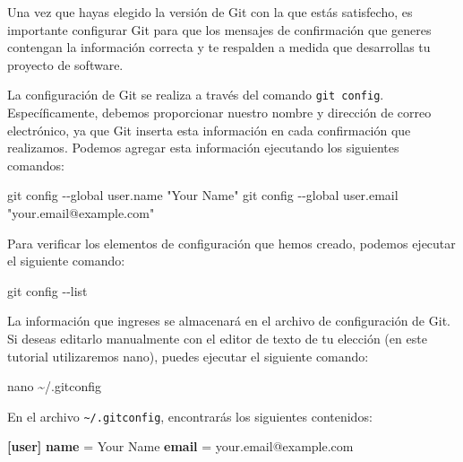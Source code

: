 \documentclass[
  a4paper,
]{article}
\newenvironment{Shaded}{}{}
\newcommand{\AttributeTok}[1]{\textcolor[rgb]{0.84,0.23,0.29}{#1}}
\newcommand{\ExtensionTok}[1]{\textcolor[rgb]{0.84,0.23,0.29}{\textbf{#1}}}
\newcommand{\FunctionTok}[1]{\textcolor[rgb]{0.44,0.26,0.76}{#1}}
\newcommand{\NormalTok}[1]{\textcolor[rgb]{0.14,0.16,0.18}{#1}}
\newcommand{\StringTok}[1]{\textcolor[rgb]{0.01,0.18,0.38}{#1}}
\begin{document}
Una vez que hayas elegido la versión de Git con la que estás satisfecho,
es importante configurar Git para que los mensajes de confirmación que
generes contengan la información correcta y te respalden a medida que
desarrollas tu proyecto de software.

La configuración de Git se realiza a través del comando
\texttt{git\ config}. Específicamente, debemos proporcionar nuestro
nombre y dirección de correo electrónico, ya que Git inserta esta
información en cada confirmación que realizamos. Podemos agregar esta
información ejecutando los siguientes comandos:

\begin{Shaded}
\begin{Highlighting}[]
\FunctionTok{git}\NormalTok{ config }\AttributeTok{{-}{-}global}\NormalTok{ user.name }\StringTok{"Your Name"}
\FunctionTok{git}\NormalTok{ config }\AttributeTok{{-}{-}global}\NormalTok{ user.email }\StringTok{"your.email@example.com"}
\end{Highlighting}
\end{Shaded}

Para verificar los elementos de configuración que hemos creado, podemos
ejecutar el siguiente comando:

\begin{Shaded}
\begin{Highlighting}[]
\FunctionTok{git}\NormalTok{ config }\AttributeTok{{-}{-}list}
\end{Highlighting}
\end{Shaded}

La información que ingreses se almacenará en el archivo de configuración
de Git. Si deseas editarlo manualmente con el editor de texto de tu
elección (en este tutorial utilizaremos nano), puedes ejecutar el
siguiente comando:

\begin{Shaded}
\begin{Highlighting}[]
\FunctionTok{nano}\NormalTok{ \textasciitilde{}/.gitconfig}
\end{Highlighting}
\end{Shaded}

En el archivo \texttt{\textasciitilde{}/.gitconfig}, encontrarás los
siguientes contenidos:

\begin{Shaded}
\begin{Highlighting}[]
\ExtensionTok{[user]}
    \ExtensionTok{name}\NormalTok{ = Your Name}
    \ExtensionTok{email}\NormalTok{ = your.email@example.com}
\end{Highlighting}
\end{Shaded}
\end{document}
